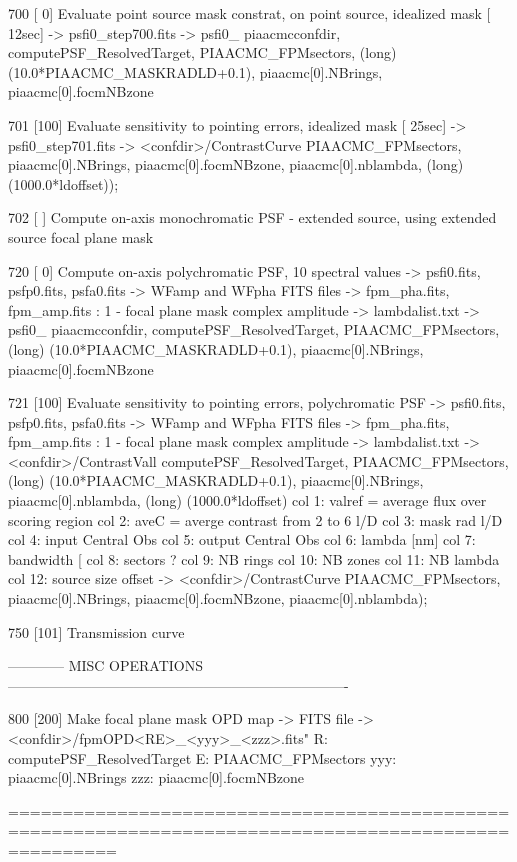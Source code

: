\begin{DoxyVerb}
700     [  0]   Evaluate point source mask constrat, on point source, idealized mask                   [ 12sec]
            -> psfi0_step700.fits
        -> psfi0_%
piaacmcconfdir, computePSF_ResolvedTarget, PIAACMC_FPMsectors, (long) (10.0*PIAACMC_MASKRADLD+0.1), piaacmc[0].NBrings, piaacmc[0].focmNBzone                                               

701     [100]   Evaluate sensitivity to pointing errors, idealized mask                                [ 25sec]
            -> psfi0_step701.fits
        -> <confdir>/ContrastCurve%
PIAACMC_FPMsectors, piaacmc[0].NBrings, piaacmc[0].focmNBzone, piaacmc[0].nblambda, (long) (1000.0*ldoffset));
    

702     [   ]   Compute on-axis monochromatic PSF - extended source, using extended source focal plane mask



720 [  0]   Compute on-axis polychromatic PSF, 10 spectral values
        -> psfi0.fits, psfp0.fits, psfa0.fits       
        -> WFamp and WFpha FITS files
        -> fpm_pha.fits, fpm_amp.fits : 1 - focal plane mask complex amplitude
        -> lambdalist.txt
        -> psfi0_%
piaacmcconfdir, computePSF_ResolvedTarget, PIAACMC_FPMsectors, (long) (10.0*PIAACMC_MASKRADLD+0.1), piaacmc[0].NBrings, piaacmc[0].focmNBzone

721 [100]   Evaluate sensitivity to pointing errors, polychromatic PSF
        -> psfi0.fits, psfp0.fits, psfa0.fits       
        -> WFamp and WFpha FITS files
        -> fpm_pha.fits, fpm_amp.fits : 1 - focal plane mask complex amplitude
        -> lambdalist.txt
        -> <confdir>/ContrastVall%
computePSF_ResolvedTarget, PIAACMC_FPMsectors, (long) (10.0*PIAACMC_MASKRADLD+0.1), piaacmc[0].NBrings, piaacmc[0].nblambda, (long) (1000.0*ldoffset)
            col 1: valref = average flux over scoring region  
            col 2: aveC = averge contrast from 2 to 6 l/D
            col 3: mask rad l/D
            col 4: input Central Obs
            col 5: output Central Obs
            col 6: lambda [nm]
            col 7: bandwidth [%
            col 8: sectors ?
            col 9: NB rings
            col 10: NB zones
            col 11: NB lambda
            col 12: source size offset
        -> <confdir>/ContrastCurve%
PIAACMC_FPMsectors, piaacmc[0].NBrings, piaacmc[0].focmNBzone, piaacmc[0].nblambda);

750 [101]   Transmission curve



------------ MISC OPERATIONS -------------------------------------------------------------------------


800     [200]   Make focal plane mask OPD map -> FITS file
        -> <confdir>/fpmOPD<RE>_<yyy>_<zzz>.fits"
            R:   computePSF_ResolvedTarget
            E:   PIAACMC_FPMsectors
            yyy: piaacmc[0].NBrings
            zzz: piaacmc[0].focmNBzone



======================================================================================================\end{DoxyVerb}
 